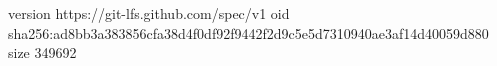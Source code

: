 version https://git-lfs.github.com/spec/v1
oid sha256:ad8bb3a383856cfa38d4f0df92f9442f2d9c5e5d7310940ae3af14d40059d880
size 349692
